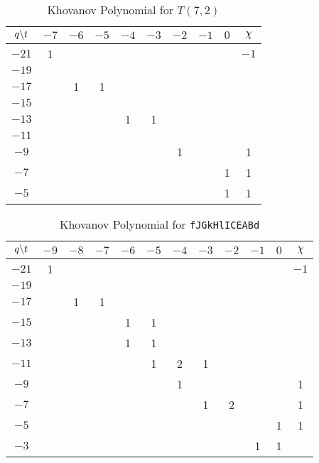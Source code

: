 \documentclass{article}
\theoremstyle{plain}
\begin{document}
        \begin{table}[H]
            \centering
            \begin{tabular}{| c | c | c | c | c | c | c | c | c | c |}
                \hline
                $q\symbol{92}t$&$-7$&$-6$&$-5$&$-4$&$-3$&$-2$&$-1$&$0$&$\chi$\\
                \hline
                $-21$&1&&&&&&&&$-1$\\
                \hline
                $-19$&&&&&&&&&\\
                \hline
                $-17$&&1&1&&&&&&\\
                \hline
                $-15$&&&&&&&&&\\
                \hline
                $-13$&&&&1&1&&&&\\
                \hline
                $-11$&&&&&&&&&\\
                \hline
                $-9$&&&&&&1&&&1\\
                \hline
                $-7$&&&&&&&&1&1\\
                \hline
                $-5$&&&&&&&&1&1\\
                \hline
            \end{tabular}
            \caption{Khovanov Polynomial for $T(7,2)$}
            \label{table:t_7_2_kho}
        \end{table}
        \begin{table}[H]
            \centering
            \begin{tabular}{| c | c | c | c | c | c | c | c | c | c | c | c |}
                \hline
                $q\symbol{92}t$&$-9$&$-8$&$-7$&$-6$&$-5$&$-4$&$-3$&$-2$&$-1$&$0$&$\chi$\\
                \hline
                $-21$&1&&&&&&&&&&$-1$\\
                \hline
                $-19$&&&&&&&&&&&\\
                \hline
                $-17$&&1&1&&&&&&&&\\
                \hline
                $-15$&&&&1&1&&&&&&\\
                \hline
                $-13$&&&&1&1&&&&&&\\
                \hline
                $-11$&&&&&1&2&1&&&&\\
                \hline
                $-9$&&&&&&1&&&&&1\\
                \hline
                $-7$&&&&&&&1&2&&&1\\
                \hline
                $-5$&&&&&&&&&&1&1\\
                \hline
                $-3$&&&&&&&&&1&1&\\
                \hline
            \end{tabular}
            \caption{Khovanov Polynomial for \texttt{fJGkHlICEABd}}
            \label{table:fJGkHlICEABd_kho}
        \end{table}
\end{document}
